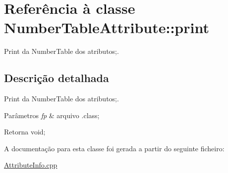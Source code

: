 \hypertarget{class_number_table_attribute_1_1print}{}\section{Referência à classe Number\+Table\+Attribute\+:\+:print}
\label{class_number_table_attribute_1_1print}


Print da Number\+Table dos atributos;.  




\subsection{Descrição detalhada}
Print da Number\+Table dos atributos;. 


\begin{DoxyParams}{Parâmetros}
{\em fp} & arquivo .class; \\
\hline
\end{DoxyParams}
\begin{DoxyReturn}{Retorna}
void; 
\end{DoxyReturn}


A documentação para esta classe foi gerada a partir do seguinte ficheiro\+:\begin{DoxyCompactItemize}
\item 
\hyperlink{_attribute_info_8cpp}{Attribute\+Info.\+cpp}\end{DoxyCompactItemize}
